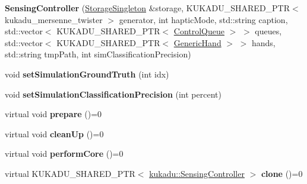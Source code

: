 \begin{DoxyCompactItemize}
\item 
{\bfseries Sensing\+Controller} (\hyperlink{classkukadu_1_1StorageSingleton}{Storage\+Singleton} \&storage, K\+U\+K\+A\+D\+U\+\_\+\+S\+H\+A\+R\+E\+D\+\_\+\+P\+TR$<$ kukadu\+\_\+mersenne\+\_\+twister $>$ generator, int haptic\+Mode, std\+::string caption, std\+::vector$<$ K\+U\+K\+A\+D\+U\+\_\+\+S\+H\+A\+R\+E\+D\+\_\+\+P\+TR$<$ \hyperlink{classkukadu_1_1ControlQueue}{Control\+Queue} $>$ $>$ queues, std\+::vector$<$ K\+U\+K\+A\+D\+U\+\_\+\+S\+H\+A\+R\+E\+D\+\_\+\+P\+TR$<$ \hyperlink{classkukadu_1_1GenericHand}{Generic\+Hand} $>$ $>$ hands, std\+::string tmp\+Path, int sim\+Classification\+Precision)\hypertarget{classkukadu_1_1SensingController_a146867a6eba3859920f9fadb2daa6535}{}\label{classkukadu_1_1SensingController_a146867a6eba3859920f9fadb2daa6535}

\item 
void {\bfseries set\+Simulation\+Ground\+Truth} (int idx)\hypertarget{classkukadu_1_1SensingController_ae8428df9d71c638898ce1d6dfcb15ce0}{}\label{classkukadu_1_1SensingController_ae8428df9d71c638898ce1d6dfcb15ce0}

\item 
void {\bfseries set\+Simulation\+Classification\+Precision} (int percent)\hypertarget{classkukadu_1_1SensingController_a315e5f755a250c6c870f23cb804b5302}{}\label{classkukadu_1_1SensingController_a315e5f755a250c6c870f23cb804b5302}

\item 
virtual void {\bfseries prepare} ()=0\hypertarget{classkukadu_1_1SensingController_afca2a16b9b8d131da2d6f5bc1a978008}{}\label{classkukadu_1_1SensingController_afca2a16b9b8d131da2d6f5bc1a978008}

\item 
virtual void {\bfseries clean\+Up} ()=0\hypertarget{classkukadu_1_1SensingController_a0b17a753858f594083f885586fa9b600}{}\label{classkukadu_1_1SensingController_a0b17a753858f594083f885586fa9b600}

\item 
virtual void {\bfseries perform\+Core} ()=0\hypertarget{classkukadu_1_1SensingController_ac7d95ce5d7cdda1db1e00221266361ea}{}\label{classkukadu_1_1SensingController_ac7d95ce5d7cdda1db1e00221266361ea}

\item 
virtual K\+U\+K\+A\+D\+U\+\_\+\+S\+H\+A\+R\+E\+D\+\_\+\+P\+TR$<$ \hyperlink{classkukadu_1_1SensingController}{kukadu\+::\+Sensing\+Controller} $>$ {\bfseries clone} ()=0\hypertarget{classkukadu_1_1SensingController_af52a9da852d4274f2ca3fb2e3b8615bc}{}\label{classkukadu_1_1SensingController_af52a9da852d4274f2ca3fb2e3b8615bc}


\end{DoxyCompactItemize}

